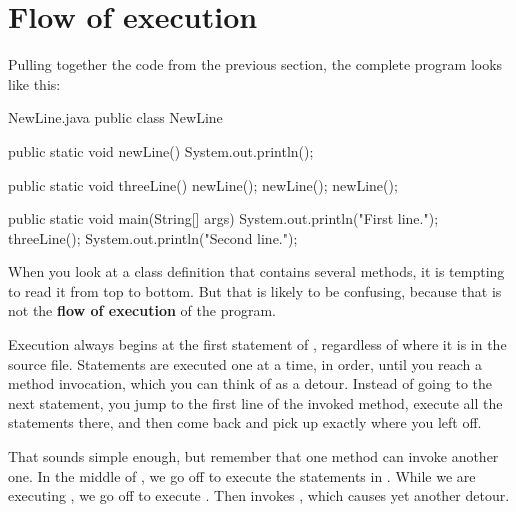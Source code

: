


\section{Flow of execution}


Pulling together the code from the previous section, the complete program looks like this:

\begin{trinket}{NewLine.java}
public class NewLine {

    public static void newLine() {
        System.out.println();
    }

    public static void threeLine() {
        newLine();
        newLine();
        newLine();
    }

    public static void main(String[] args) {
        System.out.println("First line.");
        threeLine();
        System.out.println("Second line.");
    }
}
\end{trinket}


When you look at a class definition that contains several methods, it is tempting to read it from top to bottom.
But that is likely to be confusing, because that is not the {\bf flow of execution} of the program.

Execution always begins at the first statement of , regardless of where it is in the source file.
Statements are executed one at a time, in order, until you reach a method invocation, which you can think of as a detour.
Instead of going to the next statement, you jump to the first line of the invoked method, execute all the statements there, and then come back and pick up exactly where you left off.

That sounds simple enough, but remember that one method can invoke another one.
In the middle of , we go off to execute the statements in .
While we are executing , we go off to execute .
Then  invokes , which causes yet another detour.

